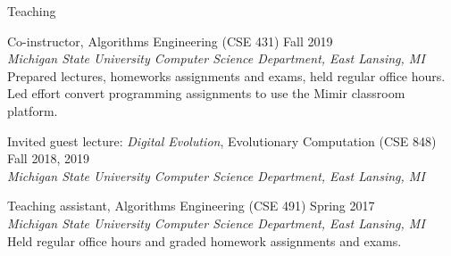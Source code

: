 \begin{rSection}{Teaching}

Co-instructor, Algorithms Engineering (CSE 431)
\hfill Fall 2019 \\
\tab \textit{Michigan State University Computer Science Department, East Lansing, MI} \\
\tab Prepared lectures, homeworks assignments and exams, held regular office hours. \\
\tab Led effort convert programming assignments to use the Mimir classroom platform.

Invited guest lecture: \textit{Digital Evolution}, Evolutionary Computation (CSE 848)
\hfill Fall 2018, 2019 \\
\tab \textit{Michigan State University Computer Science Department, East Lansing, MI}

Teaching assistant, Algorithms Engineering (CSE 491)
\hfill Spring 2017 \hfill \\
\tab \textit{Michigan State University Computer Science Department, East Lansing, MI} \\
\tab Held regular office hours and graded homework assignments and exams.

\end{rSection}